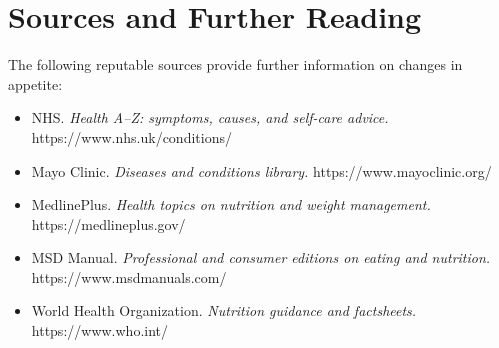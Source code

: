 \section*{Sources and Further Reading}
The following reputable sources provide further information on changes in appetite:
\begin{itemize}
    \item NHS. \textit{Health A--Z: symptoms, causes, and self-care advice.} https://www.nhs.uk/conditions/
    \item Mayo Clinic. \textit{Diseases and conditions library.} https://www.mayoclinic.org/
    \item MedlinePlus. \textit{Health topics on nutrition and weight management.} https://medlineplus.gov/
    \item MSD Manual. \textit{Professional and consumer editions on eating and nutrition.} https://www.msdmanuals.com/
    \item World Health Organization. \textit{Nutrition guidance and factsheets.} https://www.who.int/
\end{itemize}
